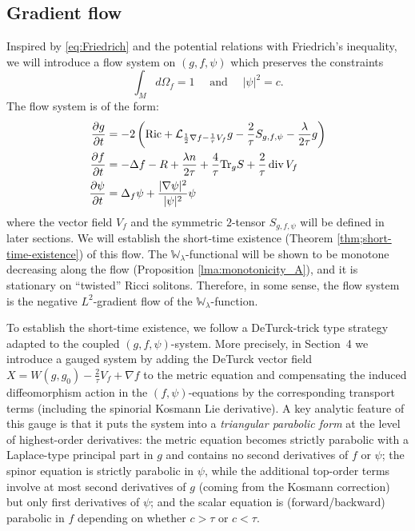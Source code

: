 \documentclass{amsart}
\theoremstyle{definition}
\theoremstyle{remark}
\numberwithin{equation}{section}
\newcommand{\abs}[1]{\left|#1\right|}
\newcommand{\Ric}{\textup{Ric}}
\newcommand{\Tr}{\textup{Tr}}
\renewcommand{\div}{\,\textup{div}}
\newcommand{\D}[2]{\frac{\partial #1}{\partial #2}}
\begin{document}
\subsection{Gradient flow}
Inspired by \eqref{eq:Friedrich} and the potential relations with Friedrich's inequality, we will introduce a flow system on $(g,f,\psi)$ which preserves the constraints
\[\int_M d\Omega_f = 1 \quad \text{ and } \quad \abs{\psi}^2 = c.\]
The flow system is of the form:
\begin{align*}
\D{g}{t} & = -2\left(\Ric  + \mathcal{L}_{\frac{1}{2}\nabla f  - \frac{1}{\tau}V_f}g - \frac{2}{\tau}S_{g,f,\psi} - \frac{\lambda}{2\tau}g\right)\\
\D{f}{t} & =  - \Delta f - R + \frac{\lambda n}{2\tau} +\frac{4}{\tau} \Tr_g S + \frac{2}{\tau}\div\,V_f \\
\D{\psi}{t} & =  \Delta_f \psi +  \frac{|\nabla\psi|^2}{|\psi|^2}\psi  
\end{align*}
where the vector field $V_f$ and the symmetric $2$-tensor $S_{g,f,\psi}$ will be defined in later sections. We will establish the short-time existence (Theorem \ref{thm;short-time-existence}) of this flow. The $\mathbb{W}_\lambda$-functional will be shown to be monotone decreasing along the flow (Proposition \ref{lma:monotonicity_A}), and it is stationary on ``twisted'' Ricci solitons. Therefore, in some sense, the flow system is the negative $L^2$-gradient flow of the $\mathbb{W}_\lambda$-function. 

To establish the short-time existence, we follow a DeTurck-trick type strategy adapted to the coupled
$(g,f,\psi)$-system. More precisely, in Section~4 we introduce a gauged system by adding the DeTurck
vector field $X = W(g,g_0) - \frac{2}{\tau}V_f + \nabla f$ to the metric equation and compensating the induced diffeomorphism action in
the $(f,\psi)$-equations by the corresponding transport terms (including the spinorial Kosmann Lie
derivative). A key analytic feature of this gauge is that it puts the system into a \emph{triangular
parabolic form} at the level of highest-order derivatives: the metric equation becomes strictly parabolic
with a Laplace-type principal part in $g$ and contains no second derivatives of $f$ or $\psi$; the spinor
equation is strictly parabolic in $\psi$, while the additional top-order terms involve at most second
derivatives of $g$ (coming from the Kosmann correction) but only first derivatives of $\psi$; and the scalar
equation is (forward/backward) parabolic in $f$ depending on whether $c>\tau$ or $c<\tau$.
\end{document}

